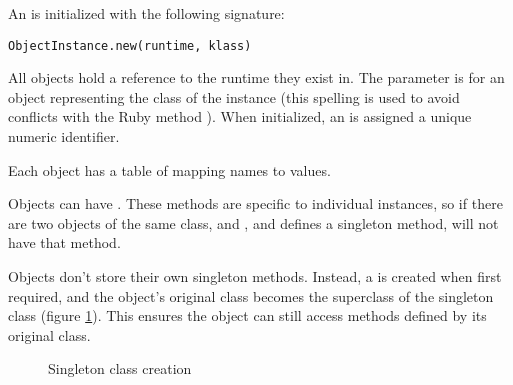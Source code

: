 An  is initialized with the following signature:

\begin{lstlisting}
ObjectInstance.new(runtime, klass)
\end{lstlisting}

All  objects hold a reference to the runtime they exist in. The  parameter is for an object representing the class of the instance (this spelling is used to avoid conflicts with the Ruby method ). When initialized, an  is assigned a unique numeric identifier.

Each object has a table of  mapping names to values.

Objects can have . These methods are specific to individual instances, so if there are two objects of the same class,  and , and  defines a singleton method,  will not have that method.

Objects don't store their own singleton methods. Instead, a  is created when first required, and the object's original class becomes the superclass of the singleton class (figure \ref{fig:singleton_class_creation}). This ensures the object can still access methods defined by its original class.

\begin{figure}
\begin{center}
\caption{Singleton class creation}
\label{fig:singleton_class_creation}
\end{center}
\end{figure}

